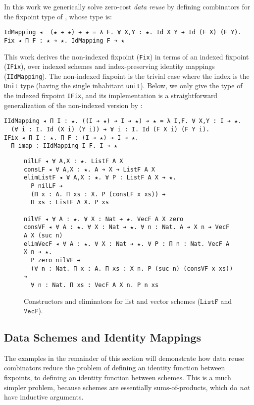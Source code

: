 \documentclass[acmsmall,screen]{acmart}
\newcommand{\labsec}[1]{\label{sec:#1}}
\newcommand{\labfig}[1]{\label{fig:#1}}
\newcommand{\txt}[1]{\ensuremath{\texttt{#1}}}
\begin{document}
In this work we generically solve zero-cost \emph{data reuse} by defining
combinators for the fixpoint type of \citet{firsov18b}, whose type is:
\begin{verbatim}
IdMapping ◂  (★ ➔ ★) ➔ ★ = λ F. ∀ X,Y : ★. Id X Y ➔ Id (F X) (F Y).
Fix ◂ Π F : ★ ➔ ★. IdMapping F ➔ ★
\end{verbatim}
This work derives the non-indexed fixpoint (\verb;Fix;) in terms of an
indexed fixpoint (\verb;IFix;), over indexed schemes and
index-preserving identity mappings (\verb;IIdMapping;). The
non-indexed fixpoint is the trivial case where the index is the
\verb;Unit; type (having the single inhabitant \verb;unit;). Below, we
only give the type of the indexed fixpoint \verb;IFix;, and its
implementation is a straightforward generalization of the non-indexed
version by \citet{firsov18b}:
\begin{verbatim}
IIdMapping ◂ Π I : ★. ((I ➔ ★) ➔ I ➔ ★) ➔ ★ = λ I,F. ∀ X,Y : I ➔ ★. 
  (∀ i : I. Id (X i) (Y i)) ➔ ∀ i : I. Id (F X i) (F Y i).
IFix ◂ Π I : ★. Π F : (I ➔ ★) ➔ I ➔ ★. 
  Π imap : IIdMapping I F. I ➔ ★
\end{verbatim}

\begin{figure}
\centering

\begin{verbatim}
nilLF ◂ ∀ A,X : ★. ListF A X
consLF ◂ ∀ A,X : ★. A ➔ X ➔ ListF A X
elimListF ◂ ∀ A,X : ★. ∀ P : ListF A X ➔ ★.
  P nilLF ➔
  (Π x : A. Π xs : X. P (consLF x xs)) ➔
  Π xs : ListF A X. P xs

nilVF ◂ ∀ A : ★. ∀ X : Nat ➔ ★. VecF A X zero
consVF ◂ ∀ A : ★. ∀ X : Nat ➔ ★. ∀ n : Nat. A ➔ X n ➔ VecF A X (suc n)
elimVecF ◂ ∀ A : ★. ∀ X : Nat ➔ ★. ∀ P : Π n : Nat. VecF A X n ➔ ★.
  P zero nilVF ➔
  (∀ n : Nat. Π x : A. Π xs : X n. P (suc n) (consVF x xs)) ➔ 
  ∀ n : Nat. Π xs : VecF A X n. P n xs
\end{verbatim}

\caption{Constructors and eliminators for list and vector schemes (\txt{ListF} and \txt{VecF}).}
\labfig{schemes}
\end{figure}

\subsection{Data Schemes and Identity Mappings}
\labsec{data:schemes}

The examples in the remainder of this section will demonstrate how
data reuse combinators reduce the problem of defining an identity
function between fixpoints, to defining an identity function between
schemes. This is a much simpler problem, because schemes are
essentially sums-of-products, which do \textit{not} have inductive
arguments.
\end{document}

